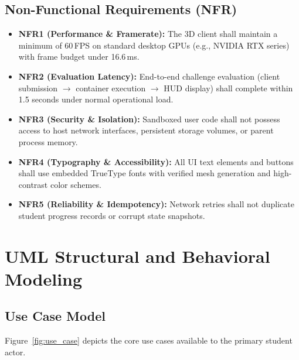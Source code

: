 \subsection{Non-Functional Requirements (NFR)}
\begin{itemize}
    \item \textbf{NFR1 (Performance \& Framerate):} The 3D client shall maintain a minimum of 60\,FPS on standard desktop GPUs (e.g., NVIDIA RTX series) with frame budget under 16.6\,ms.
    \item \textbf{NFR2 (Evaluation Latency):} End-to-end challenge evaluation (client submission $\rightarrow$ container execution $\rightarrow$ HUD display) shall complete within 1.5 seconds under normal operational load.
    \item \textbf{NFR3 (Security \& Isolation):} Sandboxed user code shall not possess access to host network interfaces, persistent storage volumes, or parent process memory.
    \item \textbf{NFR4 (Typography \& Accessibility):} All UI text elements and buttons shall use embedded TrueType fonts with verified mesh generation and high-contrast color schemes.
    \item \textbf{NFR5 (Reliability \& Idempotency):} Network retries shall not duplicate student progress records or corrupt state snapshots.
\end{itemize}

\section{UML Structural and Behavioral Modeling}

\subsection{Use Case Model}
Figure~\ref{fig:use_case} depicts the core use cases available to the primary student actor.

